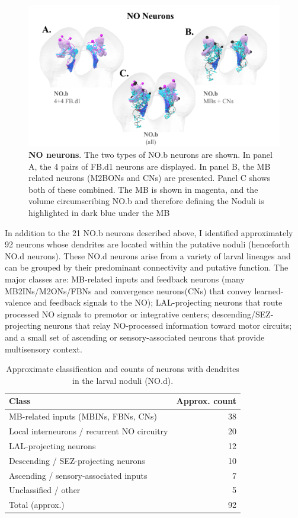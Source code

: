     \begin{figure}
        \centering
        \includegraphics[width=14cm]{Figs/CX/NOneurons.pdf}
        \caption[Noduli Neurons]{\textbf{NO neurons}. The two types of NO.b neurons are shown. In panel A, the 4 pairs of FB.d1 neurons are displayed. In panel B, the MB related neurons (M2BONs and CNs) are presented. Panel C shows both of these combined. The MB is shown in magenta, and the volume circumscribing NO.b and therefore defining the Noduli is highlighted in dark blue under the MB}
        \label{NOneurons}
    \end{figure}

    In addition to the 21 NO.b neurons described above, I identified approximately 92 neurons whose dendrites are located within the putative noduli (henceforth NO.d neurons). These NO.d neurons arise from a variety of larval lineages and can be grouped by their predominant connectivity and putative function. The major classes are: MB-related inputs and feedback neurons (many MB2INs/M2ONs/FBNs and convergence neurons(CNs) that convey learned-valence and feedback signals to the NO); LAL-projecting neurons that route processed NO signals to premotor or integrative centers; descending/SEZ-projecting neurons that relay NO-processed information toward motor circuits; and a small set of ascending or sensory-associated neurons that provide multisensory context.

    \begin{table}[H]
    \centering
    \begin{tabular}{l r}
    \toprule
    Class & Approx. count \\
    \midrule
    MB-related inputs (MBINs, FBNs, CNs) & 38 \\
    Local interneurons / recurrent NO circuitry & 20 \\
    LAL-projecting neurons & 12 \\
    Descending / SEZ-projecting neurons & 10 \\
    Ascending / sensory-associated inputs & 7 \\
    Unclassified / other & 5 \\
    \midrule
    Total (approx.) & 92 \\
    \bottomrule
    \end{tabular}
    \caption[Summary of NO.d neurons]{Approximate classification and counts of neurons with dendrites in the larval noduli (NO.d).}
    \label{NOd_summary}
    \end{table}

